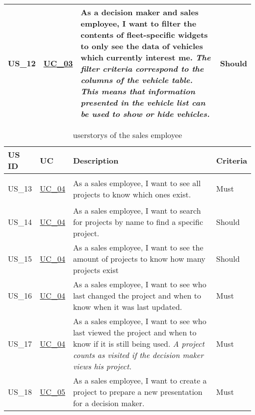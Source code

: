 \begin{footnotesize}
\begin{longtable}[L L L L]{ p{} p{} p{} p{}}
      \hypertarget{Ref:US12}{US\_12} & \hyperlink{Ref:UC3}{UC\_03} & As a decision maker and sales employee, I want to filter the contents of fleet-specific \glspl{widget} to only see the data of vehicles which currently interest me.
      \newline
      \emph{The filter criteria correspond to the columns of the vehicle table. This means that information presented in the vehicle list can be used to show or hide vehicles.}
      & Should \\

      \bottomrule
    \end{longtable}
  \end{footnotesize}
  \rmfamily

  \sffamily
  \begin{footnotesize}
    \begin{longtable}[L L L L]{ p{} p{} p{} p{} }
      \caption                       %
          {\Glspl{userstory} of the sales employee} %
          \\
      \toprule
      \textbf{US ID} & \textbf{UC} & \textbf{Description} & \textbf{Criteria} \\
      \midrule
      \hypertarget{Ref:US13}{US\_13} & \hyperlink{Ref:UC4}{UC\_04} & As a sales employee, I want to see all projects to know which ones exist. & Must \\
      \hypertarget{Ref:US14}{US\_14} & \hyperlink{Ref:UC4}{UC\_04} & As a sales employee, I want to search for projects by name to find a specific project. & Should \\
      \hypertarget{Ref:US15}{US\_15} & \hyperlink{Ref:UC4}{UC\_04} & As a sales employee, I want to see the amount of projects to know how many projects exist & Should \\
      \hypertarget{Ref:US16}{US\_16} & \hyperlink{Ref:UC4}{UC\_04} & As a sales employee, I want to see who last changed the project and when to know when it was last updated. & Must \\
      \hypertarget{Ref:US17}{US\_17} & \hyperlink{Ref:UC4}{UC\_04} & As a sales employee, I want to see who last viewed the project and when to know if it is still being used.
      \newline
      \emph{A project counts as visited if the decision maker views his project.} & Must \\
      \hypertarget{Ref:US18}{US\_18} & \hyperlink{Ref:UC5}{UC\_05} & As a sales employee, I want to create a project to prepare a new presentation for a decision maker. & Must \\

\end{longtable}
\end{footnotesize}
